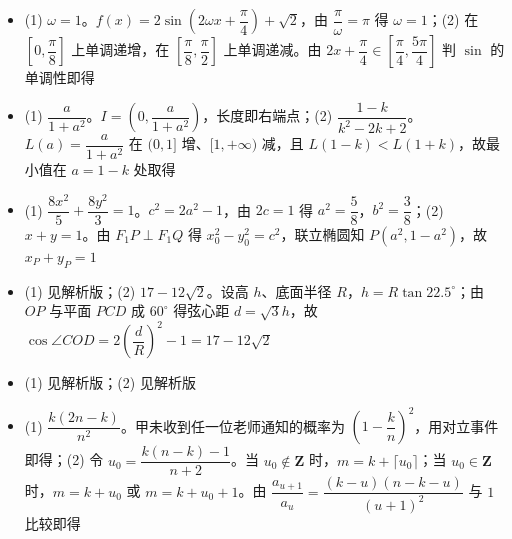 \begin{itemize}[leftmargin=2.6em]
  \item[\textbf{16.}] (1) $\omega=1$。$f(x)=2\sin\left(2\omega x+\dfrac\pi4\right)+\sqrt2$，由 $\dfrac{\pi}{\omega}=\pi$ 得 $\omega=1$；(2) 在 $\left[0,\dfrac{\pi}{8}\right]$ 上单调递增，在 $\left[\dfrac{\pi}{8},\dfrac{\pi}{2}\right]$ 上单调递减。由 $2x+\dfrac\pi4\in\left[\dfrac\pi4,\dfrac{5\pi}4\right]$ 判 $\sin$ 的单调性即得
  \item[\textbf{17.}] (1) $\dfrac{a}{1+a^2}$。$I=\left(0,\dfrac{a}{1+a^2}\right)$，长度即右端点；(2) $\dfrac{1-k}{k^2-2k+2}$。$L(a)=\dfrac{a}{1+a^2}$ 在 $(0,1]$ 增、$[1,+\infty)$ 减，且 $L(1-k)<L(1+k)$，故最小值在 $a=1-k$ 处取得
  \item[\textbf{18.}] (1) $\dfrac{8x^2}{5}+\dfrac{8y^2}{3}=1$。$c^2=2a^2-1$，由 $2c=1$ 得 $a^2=\dfrac58$，$b^2=\dfrac38$；(2) $x+y=1$。由 $F_1P\perp F_1Q$ 得 $x_0^2-y_0^2=c^2$，联立椭圆知 $P(a^2,1-a^2)$，故 $x_P+y_P=1$
  \item[\textbf{19.}] (1) 见解析版；(2) $17-12\sqrt2$。设高 $h$、底面半径 $R$，$h=R\tan22.5^\circ$；由 $OP$ 与平面 $PCD$ 成 $60^\circ$ 得弦心距 $d=\sqrt3h$，故 $\cos\angle COD=2\left(\dfrac dR\right)^2-1=17-12\sqrt2$
  \item[\textbf{20.}] (1) 见解析版；(2) 见解析版
  \item[\textbf{21.}] (1) $\dfrac{k(2n-k)}{n^2}$。甲未收到任一位老师通知的概率为 $\left(1-\dfrac kn\right)^2$，用对立事件即得；(2) 令 $u_0=\dfrac{k(n-k)-1}{n+2}$。当 $u_0\notin\mathbf Z$ 时，$m=k+\lceil u_0\rceil$；当 $u_0\in\mathbf Z$ 时，$m=k+u_0$ 或 $m=k+u_0+1$。由 $\dfrac{a_{u+1}}{a_u}=\dfrac{(k-u)(n-k-u)}{(u+1)^2}$ 与 $1$ 比较即得
\end{itemize}
